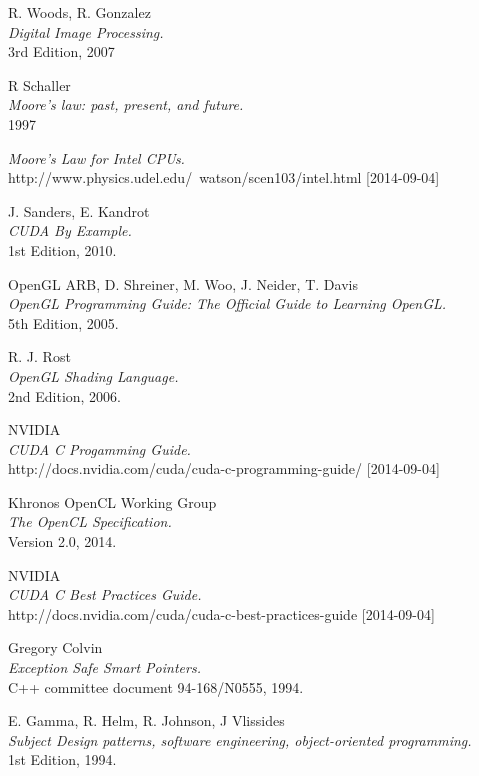\begin{thebibliography}{9}

  R. Woods, R. Gonzalez \\
  \emph{Digital Image Processing.} \\
  3rd Edition, 2007

  R Schaller \\	
  \emph{Moore's law: past, present, and future.} \\
  1997

  \emph{Moore's Law for Intel CPUs.} \\
  http://www.physics.udel.edu/~watson/scen103/intel.html [2014-09-04]

  J. Sanders, E. Kandrot \\
  \emph{CUDA By Example.} \\
  1st Edition,  2010.

  OpenGL ARB, D. Shreiner, M. Woo, J. Neider, T. Davis \\
  \emph{OpenGL Programming Guide: The Official Guide to Learning OpenGL.} \\
  5th Edition, 2005.

  R. J. Rost\\
  \emph{OpenGL Shading Language.}\\
  2nd Edition, 2006.

  NVIDIA \\
  \emph {CUDA C Progamming Guide.} \\
  http://docs.nvidia.com/cuda/cuda-c-programming-guide/ [2014-09-04]

  Khronos OpenCL Working Group \\
  \emph{The OpenCL Specification.} \\
  Version 2.0, 2014.

  NVIDIA \\
  \emph{CUDA C Best Practices Guide.} \\
  http://docs.nvidia.com/cuda/cuda-c-best-practices-guide [2014-09-04]

  Gregory Colvin \\
  \emph{Exception Safe Smart Pointers.} \\
  C++ committee document 94-168/N0555, 1994.

  E. Gamma, R. Helm, R. Johnson, J Vlissides \\
  \emph{Subject	Design patterns, software engineering, object-oriented programming.} \\
  1st Edition, 1994.


\end{thebibliography}
